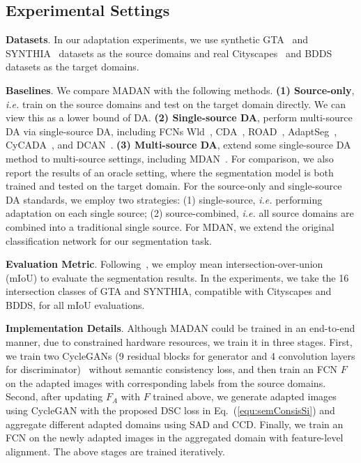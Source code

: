 \documentclass{article}
\begin{document}
\subsection{Experimental Settings}
\textbf{Datasets}. In our adaptation experiments, we use synthetic GTA~\cite{richter2016playing} and SYNTHIA~\cite{ros2016synthia} datasets as the source domains and real Cityscapes~\cite{cordts2016cityscapes} and BDDS~\cite{yu2018bdd100k} datasets as the target domains.









\textbf{Baselines}. We compare  MADAN with the following methods. \textbf{(1) Source-only}, \textit{i.e.} train on the source domains and test on the target domain directly. We can view this as a lower bound of DA. \textbf{(2) Single-source DA}, perform multi-source DA via single-source DA, including FCNs Wld~\cite{hoffman2016fcns}, CDA~\cite{zhang2017curriculum}, ROAD~\cite{chen2018road}, AdaptSeg~\cite{tsai2018learning}, CyCADA~\cite{hoffman2018cycada}, and DCAN~\cite{wu2018dcan}. \textbf{(3) Multi-source DA}, extend some single-source DA method to multi-source settings, including MDAN~\cite{zhao2018adversarial}. For comparison, we also report the results of an oracle setting, where the segmentation model is both trained and tested on the target domain.
For the source-only and single-source DA standards, we employ two strategies: (1) single-source, \textit{i.e.} performing adaptation on each single source; (2) source-combined, \textit{i.e.} all source domains are combined into a traditional single source. For MDAN, we extend the original classification network for our segmentation task.



\textbf{Evaluation Metric}.
Following~\cite{hoffman2016fcns,zhang2017curriculum,hoffman2018cycada,yue2019domain}, we employ mean intersection-over-union (mIoU) to evaluate the segmentation results. In the experiments, we take the 16 intersection classes of GTA and SYNTHIA, compatible with Cityscapes and BDDS, for all mIoU evaluations.



\textbf{Implementation Details}.
Although MADAN could be trained in an end-to-end manner, due to constrained  hardware resources, we train it in three stages. First, we train two CycleGANs (9 residual blocks for generator and 4 convolution layers for discriminator)~\cite{zhu2017unpaired} without semantic consistency loss, and then train an FCN $F$ on the adapted images with corresponding labels from the source domains. Second, after updating $F_A$ with $F$ trained above, we generate adapted images using CycleGAN with the proposed DSC loss in Eq.~(\ref{equ:semConsisSi}) and aggregate different adapted domains using SAD and CCD. Finally, we train an FCN on the newly adapted images in the aggregated domain with feature-level alignment. The above stages are trained iteratively.
\end{document}
